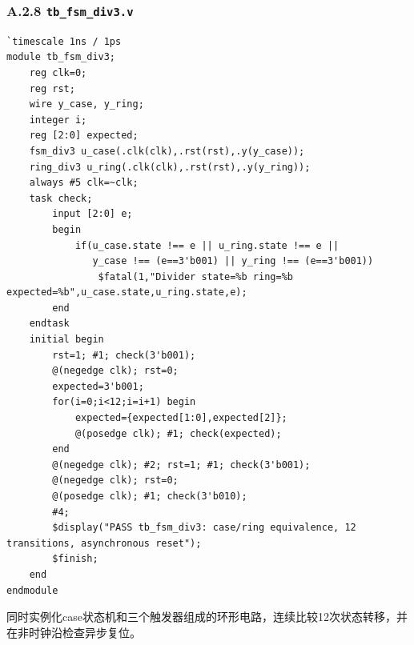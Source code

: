 \documentclass[12pt,a4paper]{ctexart}
\begin{document}
\subsubsection*{A.2.8 \texttt{tb\_fsm\_div3.v}}
\begin{lstlisting}
`timescale 1ns / 1ps
module tb_fsm_div3;
    reg clk=0;
    reg rst;
    wire y_case, y_ring;
    integer i;
    reg [2:0] expected;
    fsm_div3 u_case(.clk(clk),.rst(rst),.y(y_case));
    ring_div3 u_ring(.clk(clk),.rst(rst),.y(y_ring));
    always #5 clk=~clk;
    task check;
        input [2:0] e;
        begin
            if(u_case.state !== e || u_ring.state !== e ||
               y_case !== (e==3'b001) || y_ring !== (e==3'b001))
                $fatal(1,"Divider state=%b ring=%b expected=%b",u_case.state,u_ring.state,e);
        end
    endtask
    initial begin
        rst=1; #1; check(3'b001);
        @(negedge clk); rst=0;
        expected=3'b001;
        for(i=0;i<12;i=i+1) begin
            expected={expected[1:0],expected[2]};
            @(posedge clk); #1; check(expected);
        end
        @(negedge clk); #2; rst=1; #1; check(3'b001);
        @(negedge clk); rst=0;
        @(posedge clk); #1; check(3'b010);
        #4;
        $display("PASS tb_fsm_div3: case/ring equivalence, 12 transitions, asynchronous reset");
        $finish;
    end
endmodule
\end{lstlisting}
同时实例化case状态机和三个触发器组成的环形电路，连续比较12次状态转移，并在非时钟沿检查异步复位。
\end{document}
